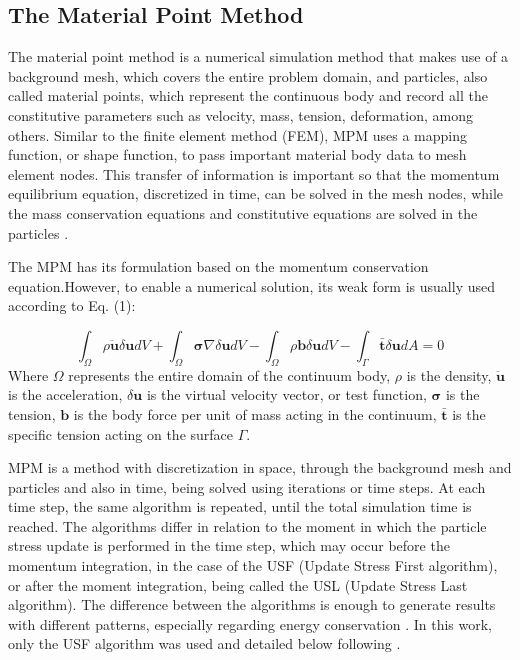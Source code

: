 \documentclass[preprint,12pt]{elsarticle}
\begin{document}
\subsection{The Material Point Method}
The material point method is a numerical simulation method that makes use of a background mesh, which covers the entire problem domain, and particles, also called material points, which represent the continuous body and record all the constitutive parameters such as velocity, mass, tension, deformation, among others. Similar to the finite element method (FEM), MPM uses a mapping function, or shape function, to pass important material body data to mesh element nodes. This transfer of information is important so that the momentum equilibrium equation, discretized in time, can be solved in the mesh nodes, while the mass conservation equations and constitutive equations are solved in the particles \cite{Fern2019}.

The MPM has its formulation based on the momentum conservation equation.However, to enable a numerical solution, its weak form is usually used according to Eq. (1):

\begin{equation}
		\int_{\Omega} \rho \ddot{\boldsymbol{u}} \delta\boldsymbol{u} dV+ \int_{\Omega} \boldsymbol{\sigma} \nabla\delta\boldsymbol{u} dV - \int_{\Omega} \rho \boldsymbol{b} \delta\boldsymbol{u} dV- \int_{\Gamma} \boldsymbol{\bar{t}} \delta\boldsymbol{u} dA = 0
\end{equation}
Where $\Omega$ represents the entire domain of the continuum body, $\rho$ is the density, $\boldsymbol{\ddot{u}}$ is the acceleration, $\delta\textbf{u}$ is the virtual velocity vector, or test function, $\boldsymbol{\sigma}$ is the tension, $\textbf{b}$ is the body force per unit of mass acting in the continuum, $\boldsymbol{\bar{t}}$ is the specific tension acting on the surface $\Gamma$.

MPM is a method with discretization in space, through the background mesh and particles and also in time, being solved using iterations or time steps. At each time step, the same algorithm is repeated, until the total simulation time is reached. The algorithms differ in relation to the moment in which the particle stress update is performed in the time step, which may occur before the momentum integration, in the case of the USF (Update Stress First algorithm), or after the moment integration, being called the USL (Update Stress Last algorithm). The difference between the algorithms is enough to generate results with different patterns, especially regarding energy conservation \cite{Bardenhagen2002}. In this work, only the USF algorithm was used and detailed below following \cite{Zhang2017}.
\end{document}
